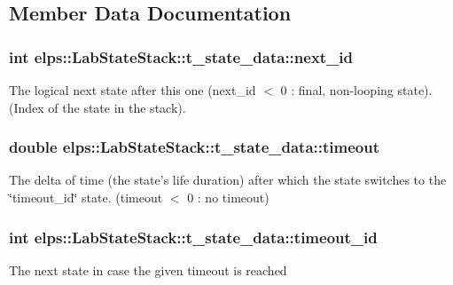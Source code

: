 \subsection{Member Data Documentation}
\hypertarget{structelps_1_1_lab_state_stack_1_1t__state__data_ac4dcaf3ae601cca167790f614b3218d5}{
\subsubsection[{next\-\_\-id}]{\setlength{\rightskip}{0pt plus 5cm}int elps\-::\-Lab\-State\-Stack\-::t\-\_\-state\-\_\-data\-::next\-\_\-id}}\label{structelps_1_1_lab_state_stack_1_1t__state__data_ac4dcaf3ae601cca167790f614b3218d5}
The logical next state after this one (next\-\_\-id $<$ 0 \-: final, non-\/looping state). (Index of the state in the stack). \hypertarget{structelps_1_1_lab_state_stack_1_1t__state__data_a8e9d1bb6ddfa12335fd73274f0aeae08}{
\subsubsection[{timeout}]{\setlength{\rightskip}{0pt plus 5cm}double elps\-::\-Lab\-State\-Stack\-::t\-\_\-state\-\_\-data\-::timeout}}\label{structelps_1_1_lab_state_stack_1_1t__state__data_a8e9d1bb6ddfa12335fd73274f0aeae08}
The delta of time (the state's life duration) after which the state switches to the \char`\"{}timeout\-\_\-id\char`\"{} state. (timeout $<$ 0 \-: no timeout) \hypertarget{structelps_1_1_lab_state_stack_1_1t__state__data_ae35e346075e8c9a36439ee0e250495e5}{
\subsubsection[{timeout\-\_\-id}]{\setlength{\rightskip}{0pt plus 5cm}int elps\-::\-Lab\-State\-Stack\-::t\-\_\-state\-\_\-data\-::timeout\-\_\-id}}\label{structelps_1_1_lab_state_stack_1_1t__state__data_ae35e346075e8c9a36439ee0e250495e5}
The next state in case the given timeout is reached 